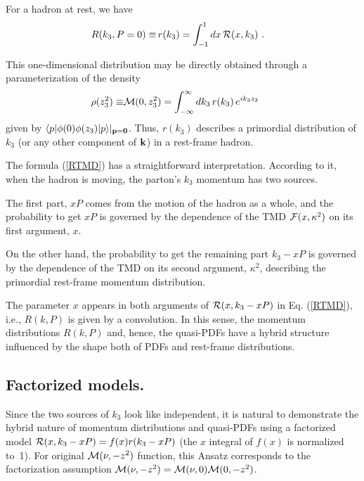 \documentclass[aps,prd,twocolumn,showpacs,preprintnumbers,superscriptaddress,groupedaddress]{revtex4-1}
\begin{document}
For a hadron at rest, we have
  \begin{align}
 R(k_3, P=0)  \equiv   &\, r(k_3)=
   \int_{-1}^1 dx\,   {\cal R} (x, k_3  )
  \  .
 \label{DTMDsmall}
\end{align} 


This one-dimensional distribution may be  directly  obtained  through   a  parameterization  
of  the density 
 \begin{align}
 \rho (z_3^2) \equiv & {\cal M} (0,z_3^2) =
\int_{-\infty}^{\infty}   dk_3 \, 
 r(k_3)  \,  e^{i k_3 z_3 } \,  
 \
 \label{dk3}
\end{align} 
given by    $  \langle p |   \phi(0) \phi ( z_3 )|p \rangle |_{ {\bf p} = {\bf 0} } $. 
Thus, $r(k_3)$  describes a primordial distribution of $k_3$ 
(or any other  component of  ${\bf k}$)  in  
a  rest-frame hadron. 

     



 The  formula (\ref{RTMD}) has a  straightforward  interpretation. 
According to it,  when the hadron is moving, the parton's $k_3$ momentum
 has  two sources.
 
 The first part, $xP$ comes from the motion
of the hadron as a whole, and   the probability to get $xP$ is governed by the dependence of
 the TMD  ${\cal F} (x, \kappa^2)$ on its first argument, $x$.
 
 On the other hand, the  probability to get the remaining part $k_3-xP$   
is governed by the  dependence of the TMD  on its second argument,
$\kappa^2$, 
describing    the primordial 
 rest-frame 
 momentum distribution.   
 
 The parameter $x$ appears in both arguments of 
 $ {\cal R} (x, k_3-xP)$  in Eq. (\ref{RTMD}), 
 i.e., $R(k,P)$   is given by a convolution. 
  In this sense, the momentum distributions  $R(k,P)$ 
 and, hence, the quasi-PDFs  have a hybrid structure  influenced by 
 the shape  both of 
 PDFs  and  rest-frame distributions.
 
 
 
\subsection{Factorized models.} 
 
 Since  the two sources of $k_3$  look like   independent, it is natural
to demonstrate  the hybrid nature of momentum distributions and quasi-PDFs using 
 a factorized model \mbox{$ {\cal R} (x, k_3-xP) = f(x) r (k_3-xP)$} 
(the $x$ integral of $f(x)$ is  normalized \mbox{to 1).}
For  original ${\cal M} (\nu,-z^2)$ function,  this Ansatz corresponds 
to the factorization assumption ${\cal M} (\nu,-z^2) = {\cal M} (\nu,0){\cal M} (0,-z^2)$.
\end{document}
